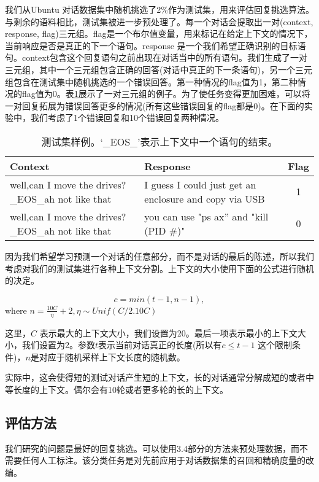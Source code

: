 \documentclass{article}
\begin{document}
\begin{multicols}{2}
		我们从Ubuntu 对话数据集中随机挑选了2\%作为测试集，用来评估回复挑选算法。与剩余的语料相比，测试集被进一步预处理了。每一个对话会提取出一对(context, response, flag)三元组。flag是一个布尔值变量，用来标记在给定上下文的情况下，当前响应是否是真正的下一个语句。response 是一个我们希望正确识别的目标语句。context包含这个回复语句之前出现在对话当中的所有语句。我们生成了一对三元组，其中一个三元组包含正确的回答(对话中真正的下一条语句)，另一个三元组包含在测试集中随机挑选的一个错误回答。第一种情况的flag值为1，第二种情况的flag值为0。表\ref{测试集样例}展示了一对三元组的例子。为了使任务变得更加困难，可以将一对回复拓展为错误回答更多的情况(所有这些错误回复的flag都是0)。在下面的实验中，我们考虑了1个错误回复和10个错误回复两种情况。
		
		\begin{table}[H]
			\centering
			\begin{tabular}{|p{3cm}|p{2.5cm}|c|}
			\hline
			\centering Context & \centering Response & Flag \\
			\hline
			\centering well,can I move the drives?\_EOS\_ah not like that & I guess I could just get an enclosure and copy via USB & 1 \\
			\hline
			well,can I move the drives?\_EOS\_ah not like that & you can use "ps ax” and "kill (PID \#)" & 0 \\
			\hline	
			\end{tabular}
			\caption{测试集样例。‘\_EOS\_’表示上下文中一个语句的结束。}
			\label{测试集样例}
		\end{table}
		
		因为我们希望学习预测一个对话的任意部分，而不是对话的最后的陈述，所以我们考虑对我们的测试集进行各种上下文分割。上下文的大小使用下面的公式进行随机的决定。
		
		$$ c = min(t-1, n-1) , $$
		\quad where $ n = \frac{10C}{\eta} + 2 , \eta \sim  Unif(C/2. 10C)$
		
		这里，$C$ 表示最大的上下文大小，我们设置为20。最后一项表示最小的上下文大小，我们设置为2。参数$t$表示当前对话真正的长度(所以有$c \le t -1 $ 这个限制条件)，$n$是对应于随机采样上下文长度的随机数。
		
		实际中，这会使得短的测试对话产生短的上下文，长的对话通常分解成短的或者中等长度的上下文。偶尔会有10轮或者更多轮的长的上下文。
		
		\subsection{评估方法}
		
		我们研究的问题是最好的回复挑选。可以使用3.4部分的方法来预处理数据，而不需要任何人工标注。该分类任务是对先前应用于对话数据集的召回和精确度量的改编。
		

\end{multicols}
\end{document}
